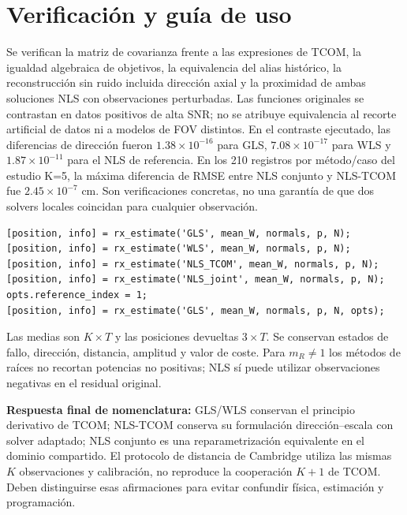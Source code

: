 \documentclass[11pt,a4paper]{article}
\begin{document}
\section{Verificación y guía de uso}
Se verifican la matriz de covarianza frente a las expresiones de TCOM, la igualdad algebraica de objetivos, la equivalencia del alias histórico, la reconstrucción sin ruido incluida dirección axial y la proximidad de ambas soluciones NLS con observaciones perturbadas. Las funciones originales se contrastan en datos positivos de alta SNR; no se atribuye equivalencia al recorte artificial de datos ni a modelos de FOV distintos. En el contraste ejecutado, las diferencias de dirección fueron $1.38\times10^{-16}$ para GLS, $7.08\times10^{-17}$ para WLS y $1.87\times10^{-11}$ para el NLS de referencia. En los 210 registros por método/caso del estudio K=5, la máxima diferencia de RMSE entre NLS conjunto y NLS-TCOM fue $2.45\times10^{-7}$ cm. Son verificaciones concretas, no una garantía de que dos solvers locales coincidan para cualquier observación.

\begin{verbatim}
[position, info] = rx_estimate('GLS', mean_W, normals, p, N);
[position, info] = rx_estimate('WLS', mean_W, normals, p, N);
[position, info] = rx_estimate('NLS_TCOM', mean_W, normals, p, N);
[position, info] = rx_estimate('NLS_joint', mean_W, normals, p, N);
opts.reference_index = 1;
[position, info] = rx_estimate('GLS', mean_W, normals, p, N, opts);
\end{verbatim}
Las medias son $K\times T$ y las posiciones devueltas $3\times T$. Se conservan estados de fallo, dirección, distancia, amplitud y valor de coste. Para $m_R\ne1$ los métodos de raíces no recortan potencias no positivas; NLS sí puede utilizar observaciones negativas en el residual original.

\textbf{Respuesta final de nomenclatura:} GLS/WLS conservan el principio derivativo de TCOM; NLS-TCOM conserva su formulación dirección--escala con solver adaptado; NLS conjunto es una reparametrización equivalente en el dominio compartido. El protocolo de distancia de Cambridge utiliza las mismas $K$ observaciones y calibración, no reproduce la cooperación $K+1$ de TCOM. Deben distinguirse esas afirmaciones para evitar confundir física, estimación y programación.



\end{document}
